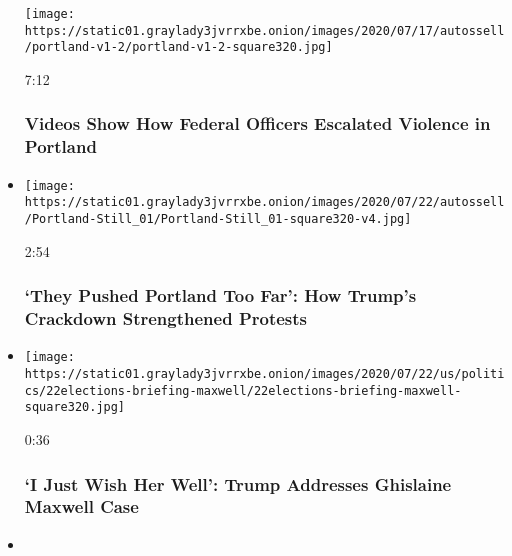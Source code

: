 \begin{itemize}
  \texttt{[image: https://static01.graylady3jvrrxbe.onion/images/2020/07/17/autossell/portland-v1-2/portland-v1-2-square320.jpg]}

  7:12

  \hypertarget{videos-show-how-federal-officers-escalated-violence-in-portland}{%
  \subsubsection{Videos Show How Federal Officers Escalated Violence in
  Portland}\label{videos-show-how-federal-officers-escalated-violence-in-portland}}
\item
  \href{https://www.nytimes3xbfgragh.onion/video/us/100000007250985/they-pushed-portland-too-far-trump-crackdown-strengthens-protests.html?action=click\&module=video-series-bar\&region=header\&pgtype=Article\&playlistId=video/u-s}{}

  \texttt{[image: https://static01.graylady3jvrrxbe.onion/images/2020/07/22/autossell/Portland-Still\_01/Portland-Still\_01-square320-v4.jpg]}

  2:54

  \hypertarget{they-pushed-portland-too-far-how-trumps-crackdown-strengthened-protests}{%
  \subsubsection{`They Pushed Portland Too Far': How Trump's Crackdown
  Strengthened
  Protests}\label{they-pushed-portland-too-far-how-trumps-crackdown-strengthened-protests}}
\item
  \href{https://www.nytimes3xbfgragh.onion/video/us/politics/100000007251195/trump-ghislaine-maxwell.html?action=click\&module=video-series-bar\&region=header\&pgtype=Article\&playlistId=video/u-s}{}

  \texttt{[image: https://static01.graylady3jvrrxbe.onion/images/2020/07/22/us/politics/22elections-briefing-maxwell/22elections-briefing-maxwell-square320.jpg]}

  0:36

  \hypertarget{i-just-wish-her-well-trump-addresses-ghislaine-maxwell-case}{%
  \subsubsection{`I Just Wish Her Well': Trump Addresses Ghislaine
  Maxwell
  Case}\label{i-just-wish-her-well-trump-addresses-ghislaine-maxwell-case}}
\item
  \href{https://www.nytimes3xbfgragh.onion/video/us/100000007250068/trump-says-virus-worse-before-better.html?action=click\&module=video-series-bar\&region=header\&pgtype=Article\&playlistId=video/u-s}{}


\end{itemize}
